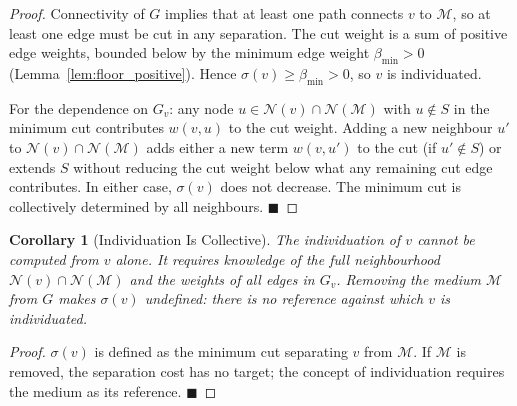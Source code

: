 \documentclass[11pt,twocolumn,a4paper]{article}
\theoremstyle{plain}
\newtheorem{corollary}[theorem]{Corollary}
\theoremstyle{definition}
\theoremstyle{remark}
\newcommand{\med}{\mathcal{M}}
\newcommand{\Nbd}{\mathcal{N}}
\newcommand{\bmin}{\beta_{\min}}
\renewcommand{\qed}{\hfill$\blacksquare$}
\begin{document}
\begin{proof}
Connectivity of $G$ implies that at least one path connects $v$ to $\med$, so
at least one edge must be cut in any separation. The cut weight is a sum of
positive edge weights, bounded below by the minimum edge weight $\bmin > 0$
(Lemma~\ref{lem:floor_positive}). Hence $\sigma(v) \geq \bmin > 0$, so $v$
is individuated.

For the dependence on $G_v$: any node $u \in \Nbd(v) \cap \Nbd(\med)$ with
$u \notin S$ in the minimum cut contributes $w(v,u)$ to the cut weight. Adding
a new neighbour $u'$ to $\Nbd(v) \cap \Nbd(\med)$ adds either a new term
$w(v,u')$ to the cut (if $u' \notin S$) or extends $S$ without reducing the
cut weight below what any remaining cut edge contributes. In either case,
$\sigma(v)$ does not decrease. The minimum cut is collectively determined by
all neighbours. \qed
\end{proof}

\begin{corollary}[Individuation Is Collective]
\label{cor:collective}
The individuation of $v$ cannot be computed from $v$ alone. It requires
knowledge of the full neighbourhood $\Nbd(v) \cap \Nbd(\med)$ and the
weights of all edges in $G_v$. Removing the medium $\med$ from $G$ makes
$\sigma(v)$ undefined: there is no reference against which $v$ is individuated.
\end{corollary}

\begin{proof}
$\sigma(v)$ is defined as the minimum cut separating $v$ from $\med$. If
$\med$ is removed, the separation cost has no target; the concept of
individuation requires the medium as its reference. \qed
\end{proof}
\end{document}
